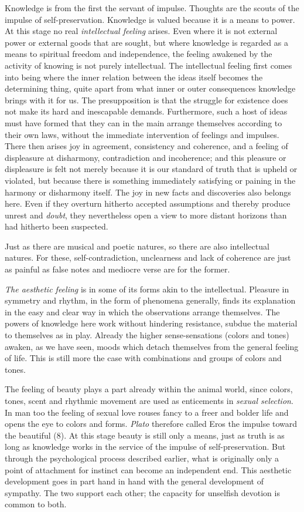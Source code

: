 \documentclass[12pt,a4paper]{book}
\newcommand{\opage}[1]{\marginnote{\footnotesize\textit{[#1]}}}
\begin{document}
Knowledge is from the first the servant of impulse. Thoughts are the
scouts of the impulse of self-preservation. Knowledge is valued because
it is a means to power. At this stage no real \emph{intellectual
feeling} arises. Even where it is not external power or external goods
that are sought, but where knowledge is regarded as a means to spiritual
freedom and independence, the feeling awakened by the activity of
knowing is not purely intellectual. The intellectual feeling first comes
into being where the inner relation between the ideas itself becomes the
determining thing, quite apart from what inner or outer consequences
knowledge brings with it for us. The presupposition is that the struggle
for existence does not make its hard and inescapable demands.
Furthermore, such a host of ideas must have formed that they can in the
main arrange themselves according to their own laws, without the
immediate intervention of feelings and impulses. There then arises joy
in agreement, consistency and coherence, and a feeling of displeasure at
disharmony, contradiction and incoherence; and this pleasure or
displeasure is felt not merely because it is our standard of truth that
is upheld or violated, but because there is something immediately
satisfying or paining in the harmony or disharmony itself. The joy in
new facts and discoveries also belongs here. Even if they overturn
hitherto accepted assumptions
\opage{315}and thereby produce unrest and \emph{doubt}, they nevertheless
open a view to more distant horizons than had hitherto been suspected.

Just as there are musical and poetic natures, so there are also
intellectual natures. For these, self-contradiction, unclearness and
lack of coherence are just as painful as false notes and mediocre verse
are for the former.

\emph{The aesthetic feeling} is in some of its forms akin to the
intellectual. Pleasure in symmetry and rhythm, in the form of phenomena
generally, finds its explanation in the easy and clear way in which the
observations arrange themselves. The powers of knowledge here work
without hindering resistance, subdue the material to themselves as in
play. Already the higher sense-sensations (colors and tones) awaken, as
we have seen, moods which detach themselves from the general feeling of
life. This is still more the case with combinations and groups of colors
and tones.

The feeling of beauty plays a part already within the animal world,
since colors, tones, scent and rhythmic movement are used as enticements
in \emph{sexual selection}. In man too the feeling of sexual love rouses
fancy to a freer and bolder life and opens the eye to colors and forms.
\emph{Plato} therefore called Eros the impulse toward the beautiful (8).
At this stage beauty is still only a means, just as truth is as long as
knowledge works in the service of the impulse of self-preservation. But
through the psychological process described earlier, what is originally
only a point of attachment for instinct can become an independent end.
This aesthetic development goes in part hand in hand with the general
development of sympathy. The two support each other; the capacity for
unselfish devotion is common to both.
\end{document}
